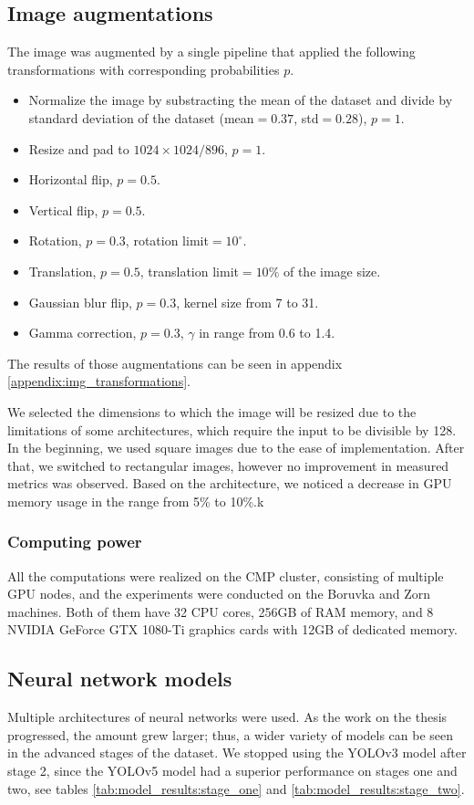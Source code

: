 \subsection{Image augmentations}
\label{sec:image_augmentations}
The image was augmented by a single pipeline that applied the following transformations with corresponding probabilities $p$.
\begin{itemize}
    \item Normalize the image by substracting the mean of the dataset and divide by standard deviation of the dataset (mean$=0.37$, std$=0.28$), $p=1$.
    \item Resize and pad to $1024\times1024/896$, $p=1$.
    \item Horizontal flip, $p=0.5$.
    \item Vertical flip, $p=0.5$.
    \item Rotation, $p=0.3$, rotation limit$=10^{\circ}$.
    \item Translation, $p=0.5$, translation limit$=10\%$ of the image size.
    \item Gaussian blur flip, $p=0.3$, kernel size from 7 to 31.
    \item Gamma correction, $p=0.3$, $\gamma$ in range from 0.6 to 1.4.
\end{itemize}
The results of those augmentations can be seen in appendix \ref{appendix:img_transformations}.

We selected the dimensions to which the image will be resized due to the limitations of some architectures, which require the input to be divisible by 128. In the beginning, we used square images due to the ease of implementation. After that, we switched to rectangular images, however no improvement in measured metrics was observed. Based on the architecture, we noticed a decrease in GPU memory usage in the range from 5\% to 10\%.k

\subsubsection{Computing power}
All the computations were realized on the CMP cluster, consisting of multiple GPU nodes, and the experiments were conducted on the Boruvka and Zorn machines. Both of them have 32 CPU cores, 256GB of RAM memory, and 8 NVIDIA GeForce GTX 1080-Ti graphics cards with 12GB of dedicated memory.

\subsection{Neural network models}
\label{sec:methods:nns}
Multiple architectures of neural networks were used. As the work on the thesis progressed, the amount grew larger; thus, a wider variety of models can be seen in the advanced stages of the dataset. We stopped using the YOLOv3 model after stage 2, since the YOLOv5 model had a superior performance on stages one and two, see tables \ref{tab:model_results:stage_one} and \ref{tab:model_results:stage_two}.

